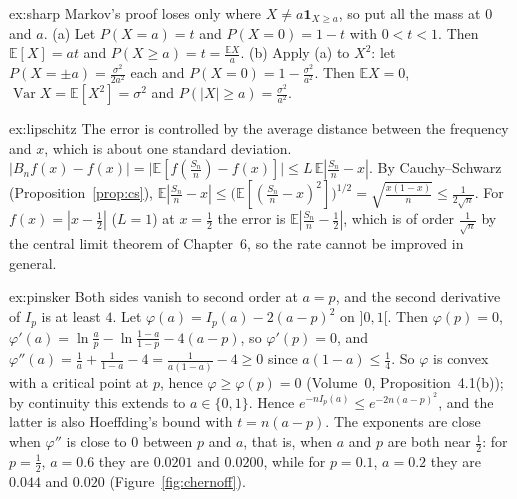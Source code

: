 \begin{solution}{ex:sharp}
\idea Markov's proof loses only where $X\ne a\mathbf 1_{X\ge a}$, so put all the mass at $0$ and $a$.
\writeup (a) Let $P(X=a)=t$ and $P(X=0)=1-t$ with $0<t<1$. Then $\mathbb E[X]=at$ and $P(X\ge a)=t=\frac{\mathbb EX}a$. (b) Apply (a) to $X^2$: let
$P(X=\pm a)=\frac{\sigma^2}{2a^2}$ each and $P(X=0)=1-\frac{\sigma^2}{a^2}$. Then $\mathbb EX=0$, $\operatorname{Var}X=\mathbb E[X^2]=\sigma^2$ and $P(|X|\ge a)=\frac{\sigma^2}{a^2}$.
\end{solution}

\begin{solution}{ex:lipschitz}
\idea The error is controlled by the average distance between the frequency and $x$, which is about one standard
deviation.
\writeup $|B_nf(x)-f(x)|=\bigl|\mathbb E[f(\frac{S_n}n)-f(x)]\bigr|\le L\,\mathbb E|\frac{S_n}n-x|$. By Cauchy--Schwarz (Proposition~\ref{prop:cs}),
$\mathbb E|\frac{S_n}n-x|\le\bigl(\mathbb E[(\frac{S_n}n-x)^2]\bigr)^{1/2}=\sqrt{\frac{x(1-x)}n}\le\frac1{2\sqrt n}$. For $f(x)=|x-\frac12|$ ($L=1$) at $x=\frac12$ the error is $\mathbb E|\frac{S_n}n-\frac12|$,
which is of order $\frac1{\sqrt n}$ by the central limit theorem of Chapter~6, so the rate cannot be improved in general.
\end{solution}

\begin{solution}{ex:pinsker}
\idea Both sides vanish to second order at $a=p$, and the second derivative of $I_p$ is at least $4$.
\writeup Let $\varphi(a)=I_p(a)-2(a-p)^2$ on $]0,1[$. Then $\varphi(p)=0$, $\varphi'(a)=\ln\frac ap-\ln\frac{1-a}{1-p}-4(a-p)$, so $\varphi'(p)=0$, and
$\varphi''(a)=\frac1a+\frac1{1-a}-4=\frac1{a(1-a)}-4\ge0$ since $a(1-a)\le\frac14$. So $\varphi$ is convex with a critical point at $p$, hence $\varphi\ge\varphi(p)=0$
(Volume~0, Proposition~4.1(b)); by continuity this extends to $a\in\{0,1\}$. Hence $e^{-nI_p(a)}\le e^{-2n(a-p)^2}$, and the latter is also Hoeffding's
bound with $t=n(a-p)$. The exponents are close when $\varphi''$ is close to $0$ between $p$ and $a$, that is, when $a$ and $p$ are both near $\frac12$:
for $p=\frac12$, $a=0.6$ they are $0.0201$ and $0.0200$, while for $p=0.1$, $a=0.2$ they are $0.044$ and $0.020$ (Figure~\ref{fig:chernoff}).
\end{solution}

